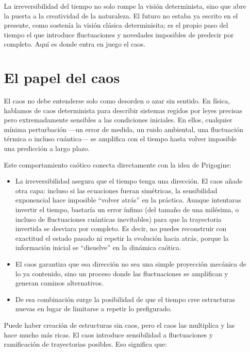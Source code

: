 \documentclass[
  11pt,
  a4paper,
  DIV=11,
  numbers=noendperiod]{scrreprt}
\begin{document}
La irreversibilidad del tiempo no solo rompe la visión determinista,
sino que abre la puerta a la creatividad de la naturaleza. El futuro no
estaba ya escrito en el presente, como sostenía la visión clásica
determinisita; es el propio paso del tiempo el que introduce
fluctuaciones y novedades imposibles de predecir por completo. Aquí es
donde entra en juego el caos.

\chapter{El papel del caos}\label{el-papel-del-caos}

El caos no debe entenderse solo como desorden o azar sin sentido. En
física, hablamos de caos determinista para describir sistemas regidos
por leyes precisas pero extremadamente sensibles a las condiciones
iniciales. En ellos, cualquier mínima perturbación ---un error de
medida, un ruido ambiental, una fluctuación térmica o incluso
cuántica--- se amplifica con el tiempo hasta volver imposible una
predicción a largo plazo.

Este comportamiento caótico conecta directamente con la idea de
Prigogine:

\begin{itemize}
\item
  La irreversibilidad asegura que el tiempo tenga una dirección. El caos
  añade otra capa: incluso si las ecuaciones fueran simétricas, la
  sensibilidad exponencial hace imposible ``volver atrás'' en la
  práctica. Aunque intentaras invertir el tiempo, bastaría un error
  ínfimo (del tamaño de una milésima, o incluso de fluctuaciones
  cuánticas inevitables) para que la trayectoria invertida se desviara
  por completo. Es decir, no puedes reconstruir con exactitud el estado
  pasado ni repetir la evolución hacia atrás, porque la información
  inicial se ``disuelve'' en la dinámica caótica.
\item
  El caos garantiza que esa dirección no sea una simple proyección
  mecánica de lo ya contenido, sino un proceso donde las fluctuaciones
  se amplifican y generan caminos alternativos.
\item
  De esa combinación surge la posibilidad de que el tiempo cree
  estructuras nuevas en lugar de limitarse a repetir lo prefigurado.
\end{itemize}

Puede haber creación de estructuras sin caos, pero el caos las
multiplica y las hace mucho más ricas. El caos introduce sensibilidad a
fluctuaciones y ramificación de trayectorias posibles. Eso significa
que:
\end{document}
